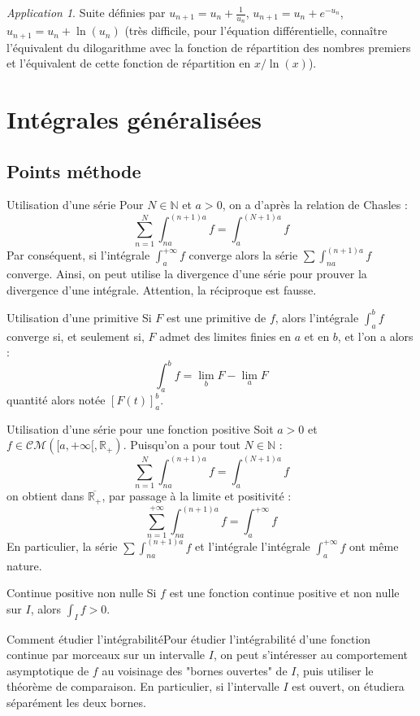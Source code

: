 \documentclass[french]{book}
\newcommand{\N}{\mathbb{N}}
\newcommand{\R}{\mathbb{R}}
\theoremstyle{plain}
\theoremstyle{definition}
\theoremstyle{remark}
\newtheorem*{app}{Application}
\begin{document}
\begin{app}
	Suite définies par $u_{n+1}=u_n+\displaystyle\frac{1}{u_n}$, $u_{n+1}=u_n+e^{-u_n}$, $u_{n+1}=u_n+\ln(u_n)$ (très difficile, pour l'équation différentielle, connaître l'équivalent du dilogarithme avec la fonction de répartition des nombres premiers et l'équivalent de cette fonction de répartition en $x/\ln(x)$).
\end{app}


\chapter{Intégrales généralisées}
\localtableofcontents
\section{Points méthode}
\begin{PM}{Utilisation d'une série} Pour $N\in\N$ et $a>0$, on a d'après la relation de Chasles : $$\sum_{n=1}^{N}\int_{na}^{(n+1)a}f=\int_{a}^{(N+1)a}f$$ Par conséquent, si l'intégrale $\displaystyle\int_{a}^{+\infty} f$ converge alors la série $\displaystyle\sum \int_{na}^{(n+1)a}f$ converge. Ainsi, on peut utilise la divergence d'une série pour prouver la divergence d'une intégrale. Attention, la réciproque est fausse.
\end{PM}
\begin{PM}{Utilisation d'une primitive} Si $F$ est une primitive de $f$, alors l'intégrale $\displaystyle\int_{a}^{b}f$ converge si, et seulement si, $F$ admet des limites finies en $a$ et en $b$, et l'on a alors : $$\int_{a}^{b}f=\lim_{b}F-\lim_{a}F$$ quantité alors notée $[F(t)]_a^b$.
\end{PM}
\begin{PM}{Utilisation d'une série pour une fonction positive} Soit $a>0$ et $f\in\mathcal{CM}([a,+\infty[,\R_+)$. Puisqu'on a pour tout $N\in\N$ : $$\sum_{n=1}^{N}\int_{na}^{(n+1)a}f=\int_{a}^{(N+1)a}f$$ on obtient dans $\overline{\R_+}$, par passage à la limite et positivité : $$\sum_{n=1}^{+\infty}\int_{na}^{(n+1)a}f=\int_{a}^{+\infty}f$$ En particulier, la série $\displaystyle\sum \int_{na}^{(n+1)a}f$ et l'intégrale l'intégrale $\displaystyle\int_{a}^{+\infty} f$ ont même nature.
\end{PM}
\begin{PM}{Continue positive non nulle} Si $f$ est une fonction continue positive et non nulle sur $I$, alors $\displaystyle\int_I f>0$.
\end{PM}
\begin{PM}{Comment étudier l'intégrabilité}Pour étudier l'intégrabilité d'une fonction continue par morceaux sur un intervalle $I$, on peut s'intéresser au comportement asymptotique de $f$ au voisinage des "bornes ouvertes" de $I$, puis utiliser le théorème de comparaison. En particulier, si l'intervalle $I$ est ouvert, on étudiera séparément les deux bornes.
\end{PM}
\end{document}
